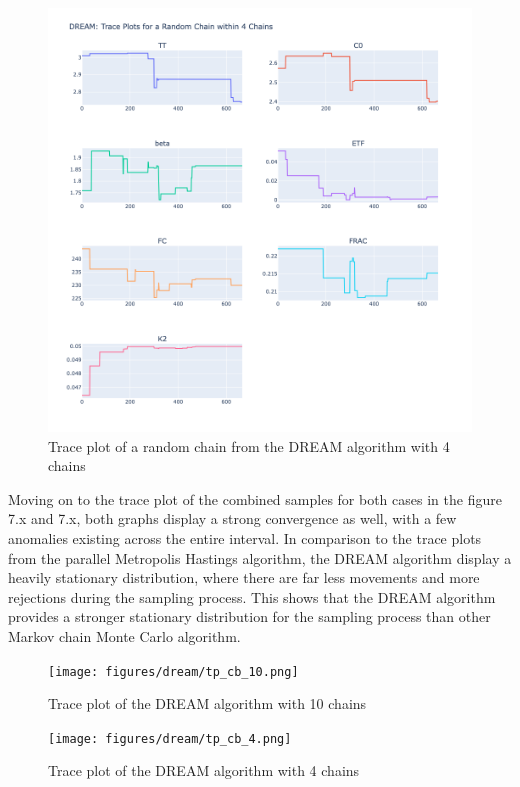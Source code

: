 \begin{figure}[H]
    \centering
    \includegraphics[width=1\textwidth]{figures/dream/tp_rand_4.png}
    \captionsetup{width=.8\textwidth}
    \caption{Trace plot of a random chain from the DREAM algorithm with 4 chains}
    \label{fig:enter-label}
\end{figure}

Moving on to the trace plot of the combined samples for both cases in the figure 7.x and 7.x, both graphs display a strong convergence as well, with a few anomalies existing across the entire interval. In comparison to the trace plots from the parallel Metropolis Hastings algorithm, the DREAM algorithm display a heavily stationary distribution, where there are far less movements and more rejections during the sampling process. This shows that the DREAM algorithm provides a stronger stationary distribution for the sampling process than other Markov chain Monte Carlo algorithm.

\begin{figure}[H]
    \centering
    \texttt{[image: figures/dream/tp\_cb\_10.png]}
    \captionsetup{width=.8\textwidth}
    \caption{Trace plot of the DREAM algorithm with 10 chains}
    \label{fig:enter-label}
\end{figure}

\begin{figure}[H]
    \centering
    \texttt{[image: figures/dream/tp\_cb\_4.png]}
    \captionsetup{width=.8\textwidth}
    \caption{Trace plot of the DREAM algorithm with 4 chains}
    \label{fig:enter-label}
\end{figure}


